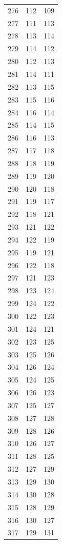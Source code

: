 \documentclass[a4paper,11pt]{article}
\begin{document}
\begin{center}
\begin{longtable}{|R{1.5cm}|R{1.5cm}|R{1.5cm}|}
  276 &  112 &  109 \\
  277 &  111 &  113 \\
  278 &  113 &  114 \\
  279 &  114 &  112 \\
  280 &  112 &  113 \\
  281 &  114 &  111 \\
  282 &  113 &  115 \\
  283 &  115 &  116 \\
  284 &  116 &  114 \\
  285 &  114 &  115 \\
  286 &  116 &  113 \\
  287 &  117 &  118 \\
  288 &  118 &  119 \\
  289 &  119 &  120 \\
  290 &  120 &  118 \\
  291 &  119 &  117 \\
  292 &  118 &  121 \\
  293 &  121 &  122 \\
  294 &  122 &  119 \\
  295 &  119 &  121 \\
  296 &  122 &  118 \\
  297 &  121 &  123 \\
  298 &  123 &  124 \\
  299 &  124 &  122 \\
  300 &  122 &  123 \\
  301 &  124 &  121 \\
  302 &  123 &  125 \\
  303 &  125 &  126 \\
  304 &  126 &  124 \\
  305 &  124 &  125 \\
  306 &  126 &  123 \\
  307 &  125 &  127 \\
  308 &  127 &  128 \\
  309 &  128 &  126 \\
  310 &  126 &  127 \\
  311 &  128 &  125 \\
  312 &  127 &  129 \\
  313 &  129 &  130 \\
  314 &  130 &  128 \\
  315 &  128 &  129 \\
  316 &  130 &  127 \\
  317 &  129 &  131 \\

\end{longtable}
\end{center}
\end{document}
